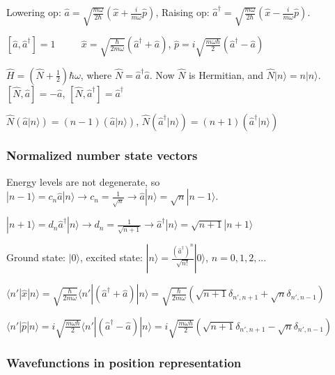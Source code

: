 Lowering op: $\widehat{a} = \sqrt{\frac{m \omega}{2 \hbar}} (\widehat{x} + \frac{i}{m \omega} \widehat{p})$, Raising op: $\widehat{a}^{\dag} = \sqrt{\frac{m \omega}{2 \hbar}} (\widehat{x} - \frac{i}{m \omega} \widehat{p})$.

$[\widehat{a}, \widehat{a}^{\dag}] = 1$ $\qquad$ $\widehat{x} = \sqrt{\frac{\hbar}{2 m \omega}} (\widehat{a}^{\dag} + \widehat{a})$, $\widehat{p} = i \sqrt{\frac{m \omega \hbar}{2}} (\widehat{a}^{\dag} - \widehat{a})$

$\widehat{H} = (\widehat{N} + \frac{1}{2}) \hbar \omega$, where $\widehat{N} = \widehat{a}^{\dag} \widehat{a}$. Now $\widehat{N}$ is Hermitian, and $\widehat{N} | n \rangle = n | n \rangle$.
$[\widehat{N}, \widehat{a}] = -\widehat{a}$, $[\widehat{N}, \widehat{a}^{\dag}] = \widehat{a}^{\dag}$

$\widehat{N} (\widehat{a} | n \rangle) = (n-1)(\widehat{a} | n \rangle)$, $\widehat{N} (\widehat{a}^{\dag} | n \rangle) = (n + 1)(\widehat{a}^{\dag} | n \rangle)$ 

\subsubsection{Normalized number state vectors}
Energy levels are not degenerate, so
$|n - 1 \rangle = c_n \widehat{a} | n \rangle \rightarrow c_n = \frac{1}{\sqrt{n}} \rightarrow \widehat{a} | n \rangle = \sqrt{n} | n - 1 \rangle$.

$|n + 1 \rangle = d_n \widehat{a}^{\dag} | n \rangle \rightarrow d_n = \frac{1}{\sqrt{n+1}} \rightarrow \widehat{a}^{\dag} | n \rangle = \sqrt{n+1} | n + 1 \rangle$

Ground state: $|0 \rangle$, excited state: $|n \rangle = \frac{(\widehat{a}^{\dag})^n}{\sqrt{n!}} | 0 \rangle$, $n=0,1,2,...$

\tiny
$\langle n' | \widehat{x} | n \rangle = \sqrt{\frac{\hbar}{2m\omega}} \langle n' | (\widehat{a}^{\dag} + \widehat{a}) | n \rangle = \sqrt{\frac{\hbar}{2 m \omega}} (\sqrt{n+1} \delta_{n', n+1} + \sqrt{n} \delta_{n', n-1})$

$\langle n' | \widehat{p} | n \rangle = i \sqrt{\frac{m \omega \hbar}{2}} \langle n' | (\widehat{a}^{\dag} - \widehat{a}) | n \rangle = i \sqrt{\frac{m \omega \hbar}{2}} (\sqrt{n+1} \delta_{n', n+1} - \sqrt{n} \delta_{n', n-1})$

\scriptsize
\subsubsection{Wavefunctions in position representation}


